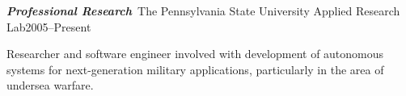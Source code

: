 \documentclass[11pt]{psuthesis}
\begin{document}
\begin{singlespace}
\medskip

\par\noindent
\textbf{\textit{Professional Research}}\, The Pennsylvania State University Applied Research Lab\hfill2005--Present
\par\noindent

\smallskip

\par\noindent
\hspace{0.10truein}  
\parbox{5.7truein}{
\par\noindent
Researcher and software engineer involved with development of autonomous systems for next-generation military applications, particularly in the area of undersea warfare.
}

\end{singlespace}
\end{document}
